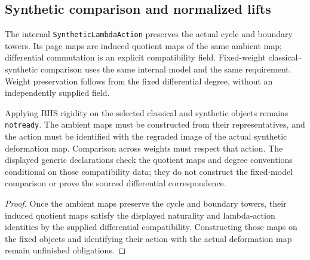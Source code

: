 \subsection{Synthetic comparison and normalized lifts}

\begin{proposition}
  \label{prop:representative-induced-synthetic-comparison}
  \notready
  The internal \texttt{SyntheticLambdaAction} preserves the actual cycle
  and boundary towers.  Its page maps are induced quotient maps of the same
  ambient map; differential commutation is an explicit compatibility field.
  Fixed-weight classical--synthetic comparison uses the same internal model
  and the same requirement.  Weight preservation follows from the fixed
  differential degree, without an independently supplied field.

  Applying BHS rigidity on the selected classical and synthetic objects
  remains \texttt{notready}. The ambient maps must be constructed from their
  representatives, and the action must be identified with the regraded image
  of the actual synthetic deformation map. Comparison across weights must
  respect that action. The displayed generic declarations check the quotient
  maps and degree conventions conditional on those compatibility data; they
  do not construct the fixed-model comparison or prove the sourced
  differential correspondence.
\end{proposition}

\begin{proof}
  Once the ambient maps preserve the cycle and boundary towers, their induced
  quotient maps satisfy the displayed naturality and lambda-action identities
  by the supplied differential compatibility. Constructing those maps on the
  fixed objects and identifying their action with the actual deformation map
  remain unfinished obligations.
\end{proof}

